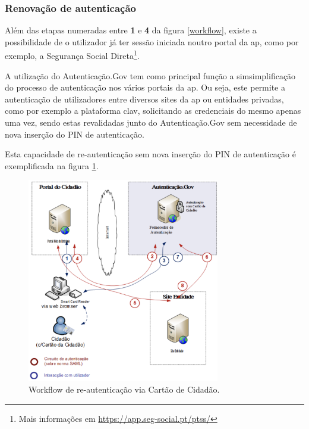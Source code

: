 \subsubsection{Renovação de autenticação} \label{renovacaoAuth}

Além das etapas numeradas entre \textbf{1} e \textbf{4} da figura \ref{workflow}, existe a possibilidade de o utilizador já ter sessão iniciada noutro portal da \gls{ap}, como por exemplo, a Segurança Social Direta\footnote{Mais informações em \url{https://app.seg-social.pt/ptss/}}.

A utilização do Autenticação.Gov tem como principal função a simsimplificação do processo de autenticação nos vários portais da \gls{ap}. Ou seja, este permite a autenticação de utilizadores entre diversos sites da \gls{ap} ou entidades privadas, como por exemplo a plataforma \gls{clav}, solicitando as credenciais do mesmo apenas uma vez, sendo estas revalidadas junto do Autenticação.Gov sem necessidade de nova inserção do PIN de autenticação.

Esta capacidade de re-autenticação sem nova inserção do PIN de autenticação é exemplificada na figura \ref{workflow2}.

\begin{figure}[h]
    \centering
    \includegraphics[width=0.75\textwidth]{img/authgov/workflow2.png}
    \caption{Workflow de re-autenticação via Cartão de Cidadão\cite{manualAuthGov}.}
    \label{workflow2}
\end{figure}

